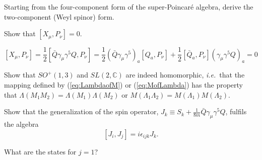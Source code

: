 \documentclass[notes.tex]{subfiles}
\begin{document}
\begin{Exercise}[]
Starting from the four-component form of the super-Poincaré algebra, derive the two-component (Weyl spinor) form.
\end{Exercise}


\begin{Exercise}[]
Show that $[X_\mu,P_\nu]=0$.
\end{Exercise}

\begin{Answer} 
\[
[X_\mu,P_\nu]=\frac{1}{2}[\bar Q\gamma_\mu\gamma^5Q,P_\nu]=\frac{1}{2}(\bar Q\gamma_\mu\gamma^5)_a[Q_a,P_\nu]+\frac{1}{2}[\bar Q_a,P_\nu](\gamma_\mu\gamma^5Q)_a=0
\]
\end{Answer}

\begin{Exercise}[]
Show that $SO^+(1,3)$ and $SL(2, \mathbb{C})$ are indeed homomorphic, {\it i.e.}\ that the mapping defined by (\ref{eq:LambdaofM}) or (\ref{eq:MofLambda}) has the property that $\Lambda(M_1M_2)=\Lambda(M_1)\Lambda(M_2)$ or $M(\Lambda_1\Lambda_2)=M(\Lambda_1)M(\Lambda_2)$.
\end{Exercise}

\begin{Exercise}[]
Show that the generalization of the spin operator, $J_k\equiv S_k + \frac{1}{8m}\bar{Q}\gamma_\mu \gamma^5 Q$, fulfils the algebra
\[[J_i, J_j] = i\epsilon_{ijk}J_k.\]
\end{Exercise}

\begin{Exercise}[]
What are the states for $j=1$?
\end{Exercise}
\end{document}
